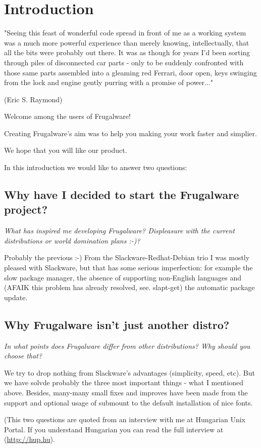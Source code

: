 \chapter{Introduction}

\begin{flushright}
"Seeing this feast of wonderful code spread in front of me as a working system was a much more powerful experience than merely knowing, intellectually, that all the bits were probably out there. It was as though for years I'd been sorting through piles of disconnected car parts - only to be suddenly confronted with those same parts assembled into a gleaming red Ferrari, door open, keys swinging from the lock and engine gently purring with a promise of power..."

(Eric S. Raymond)
\end{flushright}

Welcome among the users of Frugalware!

Creating Frugalware's aim was to help you making your work faster and simplier.

We hope that you will like our product.

In this introduction we would like to answer two questions:

\section{Why have I decided to start the Frugalware project?}

\textit{What has inspired me developing Frugalware? Displeasure with the current distributions or world domination plans :-)?}

Probably the previous :-) From the Slackware-Redhat-Debian trio I was mostly pleased with Slackware, but that has some serious imperfection: for example the slow package manager, the absence of supporting non-English languages and (AFAIK this problem has already resolved, see. slapt-get) the automatic package update.

\section{Why Frugalware isn't just another distro?}

\textit{In what points does Frugalware differ from other distributions? Why should you choose that?}

We try to drop nothing from Slackware's advantages (simplicity, speed, etc). But we have solvde probably the three most important things - what I mentioned above. Besides, many-many small fixes and improves have been made from the support and optional usage of submount to the default installation of nice fonts.

(This two questions are quoted from an interview with me at Hungarian Unix Portal. If you understand Hungarian you can read the full interview at (\url{http://hup.hu}).
